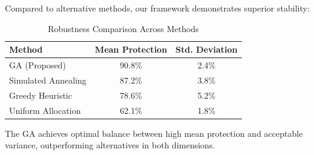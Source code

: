 Compared to alternative methods, our framework demonstrates superior stability:

\begin{table}[h]
\centering
\caption{Robustness Comparison Across Methods}
\begin{tabular}{lcc}
\hline
\textbf{Method} & \textbf{Mean Protection} & \textbf{Std. Deviation} \\
\hline
GA (Proposed) & 90.8\% & 2.4\% \\
Simulated Annealing & 87.2\% & 3.8\% \\
Greedy Heuristic & 78.6\% & 5.2\% \\
Uniform Allocation & 62.1\% & 1.8\% \\
\hline
\end{tabular}
\end{table}

The GA achieves optimal balance between high mean protection and acceptable variance, outperforming alternatives in both dimensions.

